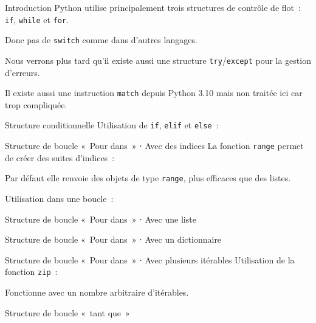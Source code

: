 \begin{frame}{Introduction}
  Python utilise principalement trois structures de contrôle de flot~: \texttt{if}, \texttt{while} et \texttt{for}.

  Donc pas de \texttt{switch} comme dans d'autres langages.

  Nous  verrons plus tard qu'il existe aussi une structure \texttt{try}/\texttt{except} pour la gestion d'erreurs.

  Il existe aussi une instruction \texttt{match} depuis Python 3.10 mais non traitée ici car trop compliquée.
\end{frame}

\begin{frame}{Structure conditionnelle}
  Utilisation de \texttt{if}, \texttt{elif} et \texttt{else}~:
\end{frame}

\begin{frame}{Structure de boucle «~Pour dans~» ⋅ Avec des indices}
  La fonction \texttt{range} permet de créer des suites d'indices~:


  Par défaut elle renvoie des objets de type \texttt{range}, plus efficaces que des listes.

  Utilisation dans une boucle~:

\end{frame}

\begin{frame}{Structure de boucle «~Pour dans~» ⋅ Avec une liste}
\end{frame}

\begin{frame}{Structure de boucle «~Pour dans~» ⋅ Avec un dictionnaire}
\end{frame}

\begin{frame}{Structure de boucle «~Pour dans~» ⋅ Avec plusieurs itérables}
  Utilisation de la fonction \texttt{zip}~:


  Fonctionne avec un nombre arbitraire d'itérables.
\end{frame}

\begin{frame}{Structure de boucle «~tant que~»}
\end{frame}

